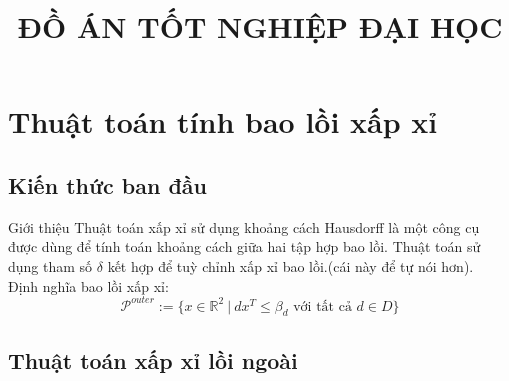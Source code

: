 \documentclass[11pt]{beamer}
\title[ \footnotesize  \textcolor{red}{\bf Đồ án tốt nghiệp} -- \textcolor{blue}{Trần Xuân Độ }]{\Large  \bf ĐỒ ÁN TỐT NGHIỆP ĐẠI HỌC}
\institute{\bf  Hà Nội, tháng 12 năm 2023}
\theoremstyle{definition}
\theoremstyle{plain}
\theoremstyle{plain}
\theoremstyle{remark}
\begin{document}

	\section{Thuật toán tính bao lồi xấp xỉ}
	\subsection{Kiến thức ban đầu}
	\begin{frame}{Giới thiệu}
		Thuật toán xấp xỉ sử dụng khoảng cách Hausdorff là một công cụ được dùng để tính toán khoảng cách giữa hai tập hợp bao lồi.
		Thuật toán sử dụng tham số $\delta$ kết hợp để tuỳ chỉnh xấp xỉ bao lồi.(cái này để tự nói hơn).\\
			Định nghĩa bao lồi xấp xỉ:
		\begin{equation}
			\mathcal{P}^{outer} := \{x \in \mathbb{R}^2 \ | \ d x^T \leq \beta_d \text{ với tất cả } d \in D\}
		\end{equation}
	\end{frame}	
		\subsection{Thuật toán xấp xỉ lồi ngoài}
\end{document}
